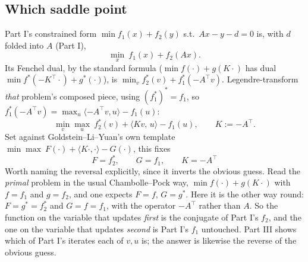 \documentclass[11pt]{article}
\begin{document}
\subsection*{Which saddle point}
Part I's constrained form $\min f_1(x)+f_2(y)$ s.t.\ $Ax-y-d=0$ is, with $d$
folded into $A$ (Part I),
\[
\min_{x}\ f_1(x)+f_2(Ax).
\]
Its Fenchel dual, by the standard formula ($\min f(\cdot)+g(K\cdot)$ has dual
$\min f^*(-K^\top\cdot)+g^*(\cdot)$), is $\min_v f_2^*(v)+f_1^*(-A^\top v)$.
Legendre-transform \emph{that} problem's composed piece, using $(f_1^*)^*=f_1$, so
$f_1^*(-A^\top v)=\max_u\langle -A^\top v,u\rangle-f_1(u)$:
\begin{equation}
\min_{v}\max_{u}\ f_2^*(v)+\langle Kv,\,u\rangle-f_1(u),
\qquad K:=-A^\top. \label{eq:saddle}
\end{equation}
Set against Goldstein--Li--Yuan's own template
$\min\max\ F(\cdot)+\langle K\cdot,\cdot\rangle-G(\cdot)$, this fixes
\[
\boxed{F=f_2^*,\qquad G=f_1,\qquad K=-A^\top}
\]
Worth naming the reversal explicitly, since it inverts the obvious guess. Read
the \emph{primal} problem in the usual Chambolle--Pock way, $\min f(\cdot)+g(K\cdot)$
with $f=f_1$ and $g=f_2$, and one expects $F=f$, $G=g^*$. Here it is the other way
round: $F=g^*=f_2^*$ and $G=f=f_1$, with the operator $-A^\top$ rather than $A$.
So the function on the variable that updates \emph{first} is the conjugate of
Part I's $f_2$, and the one on the variable that updates \emph{second} is Part I's
$f_1$ untouched. Part III shows which of Part I's iterates each of $v,u$ is; the
answer is likewise the reverse of the obvious guess.
\end{document}
